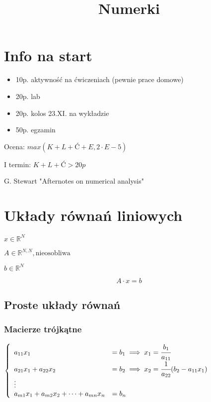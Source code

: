 \documentclass[hidelinks,a4paper]{article}
\title{Numerki}
\newcommand{\RR}{\mathbb{R}}
\begin{document}
\linespread{1.0}
\maketitle

\tableofcontents

\clearpage

\section*{Info na start}

\begin{itemize}
	\item 10p. aktywność na ćwiczeniach (pewnie prace domowe)
	\item 20p. lab
	\item 20p. kolos 23.XI. na wykładzie
	\item 50p. egzamin
\end{itemize}

Ocena: $max(K + L + Ć + E, 2 \cdot E - 5)$

I termin: $K + L + Ć > 20p$

G. Stewart "Afternotes on numerical analysis"

\section{Układy równań liniowych}

$x \in \RR^N$

$A \in \RR^{N,N}, \textrm{nieosobliwa}$

$b \in \RR^N$

\[
	A \cdot x = b
\]

\subsection{Proste układy równań}

\subsubsection{Macierze trójkątne}

$
\left\{
\begin{array}{ll}
	a_{11}x_1                                  & = b_1 \implies x_1 = \cfrac{b_1}{a_{11}}                \\
	a_{21}x_1 + a_{22}x_2                      & = b_2 \implies x_2 = \cfrac{1}{a_{22}}(b_2 - a_{11}x_1) \\
	\vdots \\
	a_{m1}x_1 + a_{m2}x_2 + \cdots + a_{mn}x_n & = b_n                                                   
\end{array}
\right.
$
\end{document}

